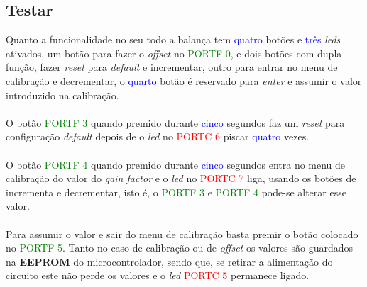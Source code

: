 \subsection*{Testar}
Quanto a funcionalidade no seu todo a balança tem \textcolor{blue}{quatro} botões e \textcolor{blue}{três} \textit{leds} ativados, um botão para fazer o \textit{offset} no \textcolor{green}{PORTF 0}, e dois botões com dupla função, fazer \textit{reset} para \textit{default} e incrementar, outro para entrar no menu de calibração e decrementar, o \textcolor{blue}{quarto} botão é reservado para \textit{enter} e assumir o valor introduzido na calibração.\\
\\
O botão \textcolor{green}{PORTF 3} quando premido durante \textcolor{blue}{cinco} segundos faz um \textit{reset} para configuração \textit{default} depois de o \textit{led} no \textcolor{red}{PORTC 6} piscar \textcolor{blue}{quatro} vezes.\\
\\
O botão \textcolor{green}{PORTF 4} quando premido durante \textcolor{blue}{cinco} segundos entra no menu de calibração do valor do \textit{gain factor} e o \textit{led} no \textcolor{red}{PORTC 7} liga, usando os botões de incrementa e decrementar, isto é, o
\textcolor{green}{PORTF 3} e \textcolor{green}{PORTF 4} pode-se alterar esse valor.\\
\\
Para assumir o valor e sair do menu de calibração basta premir o botão colocado no \textcolor{green}{PORTF 5}. Tanto no caso de calibração ou de \textit{offset} os valores são guardados na \textbf{EEPROM} do microcontrolador, sendo que, se retirar a alimentação do circuito este não perde os valores e o \textit{led} \textcolor{red}{PORTC 5} permanece ligado.
\\
\\

